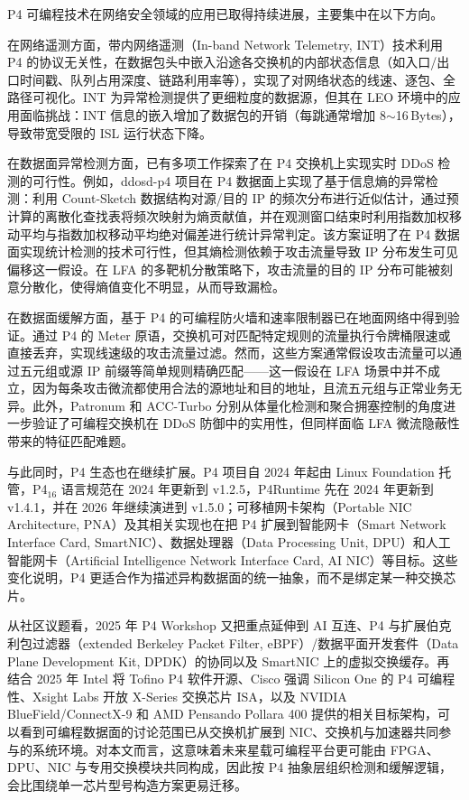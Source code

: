 P4 可编程技术在网络安全领域的应用已取得持续进展，主要集中在以下方向。

在网络遥测方面，带内网络遥测（In-band Network Telemetry, INT）技术利用 P4 的协议无关性，在数据包头中嵌入沿途各交换机的内部状态信息（如入口/出口时间戳、队列占用深度、链路利用率等），实现了对网络状态的线速、逐包、全路径可视化。INT 为异常检测提供了更细粒度的数据源，但其在 LEO 环境中的应用面临挑战：INT 信息的嵌入增加了数据包的开销（每跳通常增加 8$\sim$16\,Bytes），导致带宽受限的 ISL 运行状态下降。

在数据面异常检测方面，已有多项工作探索了在 P4 交换机上实现实时 DDoS 检测的可行性。例如，ddosd-p4 项目在 P4 数据面上实现了基于信息熵的异常检测：利用 Count-Sketch 数据结构对源/目的 IP 的频次分布进行近似估计，通过预计算的离散化查找表将频次映射为熵贡献值，并在观测窗口结束时利用指数加权移动平均与指数加权移动平均绝对偏差进行统计异常判定。该方案证明了在 P4 数据面实现统计检测的技术可行性，但其熵检测依赖于攻击流量导致 IP 分布发生可见偏移这一假设。在 LFA 的多靶机分散策略下，攻击流量的目的 IP 分布可能被刻意分散化，使得熵值变化不明显，从而导致漏检。

在数据面缓解方面，基于 P4 的可编程防火墙和速率限制器已在地面网络中得到验证。通过 P4 的 Meter 原语，交换机可对匹配特定规则的流量执行令牌桶限速或直接丢弃，实现线速级的攻击流量过滤。然而，这些方案通常假设攻击流量可以通过五元组或源 IP 前缀等简单规则精确匹配——这一假设在 LFA 场景中并不成立，因为每条攻击微流都使用合法的源地址和目的地址，且流五元组与正常业务无异。此外，Patronum 和 ACC-Turbo 分别从体量化检测和聚合拥塞控制的角度进一步验证了可编程交换机在 DDoS 防御中的实用性，但同样面临 LFA 微流隐蔽性带来的特征匹配难题。

与此同时，P4 生态也在继续扩展。P4 项目自 2024 年起由 Linux Foundation 托管，P4$_{16}$ 语言规范在 2024 年更新到 v1.2.5，P4Runtime 先在 2024 年更新到 v1.4.1，并在 2026 年继续演进到 v1.5.0；可移植网卡架构（Portable NIC Architecture, PNA）及其相关实现也在把 P4 扩展到智能网卡（Smart Network Interface Card, SmartNIC）、数据处理器（Data Processing Unit, DPU）和人工智能网卡（Artificial Intelligence Network Interface Card, AI NIC）等目标。这些变化说明，P4 更适合作为描述异构数据面的统一抽象，而不是绑定某一种交换芯片。

从社区议题看，2025 年 P4 Workshop 又把重点延伸到 AI 互连、P4 与扩展伯克利包过滤器（extended Berkeley Packet Filter, eBPF）/数据平面开发套件（Data Plane Development Kit, DPDK）的协同以及 SmartNIC 上的虚拟交换缓存。再结合 2025 年 Intel 将 Tofino P4 软件开源、Cisco 强调 Silicon One 的 P4 可编程性、Xsight Labs 开放 X-Series 交换芯片 ISA，以及 NVIDIA BlueField/ConnectX-9 和 AMD Pensando Pollara 400 提供的相关目标架构，可以看到可编程数据面的讨论范围已从交换机扩展到 NIC、交换机与加速器共同参与的系统环境。对本文而言，这意味着未来星载可编程平台更可能由 FPGA、DPU、NIC 与专用交换模块共同构成，因此按 P4 抽象层组织检测和缓解逻辑，会比围绕单一芯片型号构造方案更易迁移。


